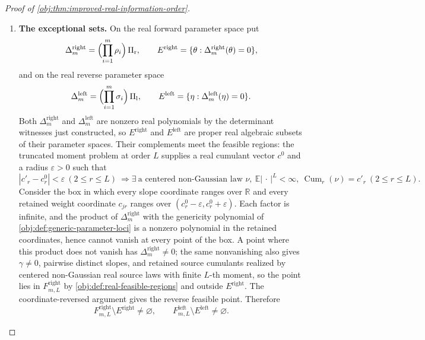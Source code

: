 \begin{proof}[Proof of \cref{obj:thm:improved-real-information-order}]
\begin{enumerate}
\item \textbf{The exceptional sets.}  On the real forward parameter space put
\[
\Delta^{\mathrm{right}}_m=\Bigl(\prod_{i=1}^m\rho_i\Bigr)\,\Pi_{\mathrm r},
\qquad
E^{\mathrm{right}}=\{\theta:\Delta^{\mathrm{right}}_m(\theta)=0\},
\]
and on the real reverse parameter space
\[
\Delta^{\mathrm{left}}_m=\Bigl(\prod_{i=1}^m\sigma_i\Bigr)\,\Pi_{\mathrm l},
\qquad
E^{\mathrm{left}}=\{\eta:\Delta^{\mathrm{left}}_m(\eta)=0\}.
\]
Both \(\Delta^{\mathrm{right}}_m\) and \(\Delta^{\mathrm{left}}_m\) are nonzero real polynomials by the determinant witnesses just constructed, so \(E^{\mathrm{right}}\) and \(E^{\mathrm{left}}\) are proper real algebraic subsets of their parameter spaces.  Their complements meet the feasible regions: the truncated moment problem at order \(L\) supplies a real cumulant vector \(c^{0}\) and a radius \(\varepsilon>0\) such that
\[
|c'_r-c^{0}_r|<\varepsilon\ (2\le r\le L)
\ \Longrightarrow
\exists\ \text{a centered non-Gaussian law }\nu,\ \mathbb E|\,\cdot\,|^{L}<\infty,\ \operatorname{Cum}_r(\nu)=c'_r\ (2\le r\le L).
\]
Consider the box in which every slope coordinate ranges over \(\mathbb R\) and every retained weight coordinate \(c_{jr}\) ranges over \((c^{0}_r-\varepsilon,c^{0}_r+\varepsilon)\).  Each factor is infinite, and the product of \(\Delta^{\mathrm{right}}_m\) with the genericity polynomial of \cref{obj:def:generic-parameter-loci} is a nonzero polynomial in the retained coordinates, hence cannot vanish at every point of the box.  A point where this product does not vanish has \(\Delta^{\mathrm{right}}_m\ne0\); the same nonvanishing also gives \(\gamma\ne0\), pairwise distinct slopes, and retained source cumulants realized by centered non-Gaussian real source laws with finite \(L\)-th moment, so the point lies in \(F^{\mathrm{right}}_{m,L}\) by \cref{obj:def:real-feasible-regions} and outside \(E^{\mathrm{right}}\).  The coordinate-reversed argument gives the reverse feasible point.  Therefore
\[
F^{\mathrm{right}}_{m,L}\setminus E^{\mathrm{right}}\ne\varnothing,
\qquad
F^{\mathrm{left}}_{m,L}\setminus E^{\mathrm{left}}\ne\varnothing .
\]


\end{enumerate}
\end{proof}
